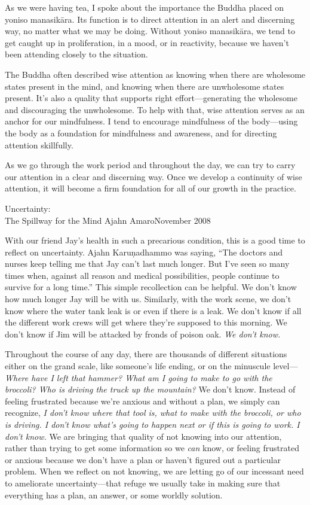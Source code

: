 As we were having tea, I spoke about the importance the Buddha placed 
on yoniso manasikāra. Its function is to direct attention in an alert 
and discerning way, no matter what we may be doing. Without yoniso 
manasikāra, we tend to get caught up in proliferation, in a mood, or 
in reactivity, because we haven't been attending closely to the 
situation.

The Buddha often described wise attention as knowing when there are
wholesome states present in the mind, and knowing when there are
unwholesome states present. It's also a quality that supports right
effort---generating the wholesome and discouraging the unwholesome. To
help with that, wise \mbox{attention} serves as an anchor for our
mindfulness.  I tend to encourage mindfulness of the body---using the
body as a foundation for mindfulness and awareness, and for directing
attention skillfully.

As we go through the work period and throughout the day, we can try to 
carry our attention in a clear and discerning way. Once we develop a 
continuity of wise attention, it will become a firm foundation for all 
of our growth in the practice.

{Uncertainty:\\The Spillway for the Mind}
{Ajahn Amaro}{November 2008}

With our friend Jay's health in such a precarious condition, this is a 
good time to reflect on uncertainty. Ajahn Karuṇadhammo was saying, 
``The doctors and nurses keep telling me that Jay can't last much 
longer. But I've seen so many times when, against all reason and 
medical possibilities, people continue to survive for a long time.'' 
This simple recollection can be helpful. We don't know how much longer 
Jay will be with us. Similarly, with the work scene, we don't know 
where the water tank leak is or even if there is a leak. We don't know 
if all the different work crews will get where they're supposed to this 
morning. We don't know if Jim will be attacked by fronds of poison oak. 
\emph{We don't know.}

Throughout the course of any day, there are thousands of different 
situations either on the grand scale, like someone's life ending, or on 
the minuscule level---\emph{Where have I left that hammer? What am I 
going to make to go with the broccoli? Who is driving the truck up the 
mountain?} We don't know. Instead of feeling frustrated because we're 
anxious and without a plan, we simply can recognize, \emph{I don't know 
where that tool is, what to make with the broccoli, or who is driving. 
I don't know what's going to happen next or if this is going to work. I 
don't know.} We are bringing that quality of not knowing into our 
attention, rather than trying to get some information so we \emph{can} 
know, or feeling frustrated or anxious because we don't have a plan or 
haven't figured out a particular problem. When we reflect on not 
knowing, we are letting go of our incessant need to ameliorate 
uncertainty---that refuge we usually take in making sure that 
everything has a plan, an answer, or some worldly solution.

